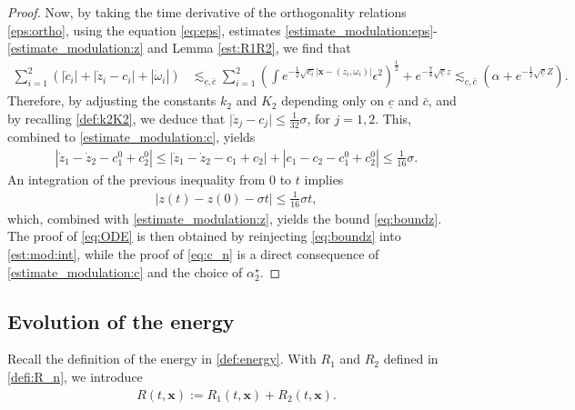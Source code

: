 \documentclass[reqno,10pt]{amsart}
\numberwithin{equation}{section}
\newcommand{\bx}{\mathbf{x}}
\begin{document}
\begin{proof}
		Now, by taking the time derivative of the orthogonality relations \eqref{eps:ortho}, using the equation \eqref{eq:eps}, estimates \eqref{estimate_modulation:eps}-\eqref{estimate_modulation:z} and Lemma \ref{est:R1R2}, we find that
		\begin{align} \label{est:mod:int}
			\sum_{i=1}^2\left( \left\vert \dot{c}_i \right\vert + \left\vert \dot{z}_i - c_i \right\vert + \left\vert \dot{\omega}_i \right\vert \right)
			& \lesssim_{\underline{c},\bar{c}} \sum_{i=1}^2 \left( \int e^{-\frac{1}{2}\sqrt{c_i}\left\vert \bx - (z_i,\omega_i)\right\vert} \epsilon^2 \right)^\frac12 +  e^{-\frac78 \sqrt{\underline{c}} z} \lesssim_{\underline{c},\bar{c}}  \left( \alpha + e^{-\frac12 \sqrt{\underline{c}} Z} \right). 
		\end{align}
		Therefore, by adjusting the constants $k_2$ and $K_2$ depending only on $\underline{c}$ and $\bar{c}$, and by recalling \eqref{def:k2K2}, we deduce that $\vert \dot{z}_j - c_j \vert \leq \frac1{32} \sigma$, for $j=1,2$. This, combined to \eqref{estimate_modulation:c}, yields
		\begin{align*}
			\left\vert \dot{z}_1- \dot{z}_2 - c_1^0 + c_2^0 \right\vert \leq \left\vert \dot{z}_1- \dot{z}_2 - c_1+c_2 \right\vert + \left\vert c_1-c_2 - c_1^0 + c_2^0 \right\vert  \leq \frac1{16} \sigma.
		\end{align*}
		An integration of the previous inequality from $0$ to $t$ implies
		\begin{align}\label{eq:encad_z}
			\left\vert z(t)-z(0) - \sigma t \right\vert \leq \frac1{16} \sigma t,
		\end{align}
		which, combined with \eqref{estimate_modulation:z}, yields the bound \eqref{eq:boundz}. The proof of \eqref{eq:ODE} is then obtained  by reinjecting \eqref{eq:boundz} into \eqref{est:mod:int}, while the proof of \eqref{eq:c_n} is a direct consequence of \eqref{estimate_modulation:c} and the choice of $\alpha_2^{\star}$. 
	\end{proof}


	\subsection{Evolution of the energy}
	
	Recall the definition of the energy in \eqref{def:energy}.
	With $R_1$ and $R_2$ defined in \eqref{defi:R_n}, we introduce
	\begin{align*}
		R(t, \bx):= R_1(t,\bx) + R_2(t, \bx).
	\end{align*}
	
\end{document}
